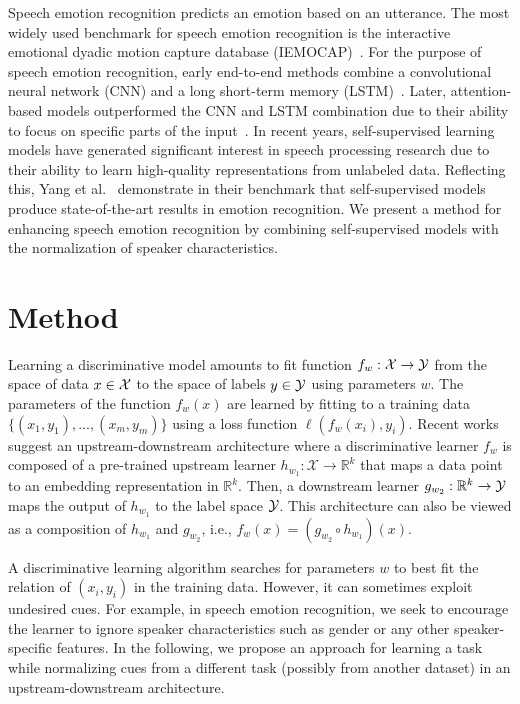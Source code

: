 \documentclass{article}
\newcommand{\X}{\cal X}
\newcommand{\Y}{\cal Y}
\renewcommand{\[}{\begin{eqnarray}}
\renewcommand{\]}{\end{eqnarray}}
\newcommand{\R}{\mathbb{R}}
\begin{document}
Speech emotion recognition predicts an emotion based on an utterance. The most widely used benchmark for speech emotion recognition is the interactive emotional dyadic motion capture database (IEMOCAP)~\cite{iemocap}. For the purpose of speech emotion recognition, early end-to-end methods combine a convolutional neural network (CNN) and a long short-term memory (LSTM)~\cite{Keren2016ConvolutionalRA, Mirsamadi2017AutomaticSE, Trigeorgis2016AdieuFE}. Later, attention-based models outperformed the CNN and LSTM combination due to their ability to focus on specific parts of the input~\cite{moine2021speaker, Chen20183DCR, Li2019ImprovedES}. In recent years, self-supervised learning models have generated significant interest in speech processing research due to their ability to learn high-quality representations from unlabeled data. Reflecting this, Yang et al.~\cite{s3prl} demonstrate in their benchmark that self-supervised models produce state-of-the-art results in emotion recognition. We present a method for enhancing speech emotion recognition by combining self-supervised models with the normalization of speaker characteristics.




\section{Method}\label{sec:method}
Learning a discriminative model amounts to fit function $f_w: \X \rightarrow \Y$ from the space of data $x \in \X$ to the space of labels $y \in \Y$ using parameters $w$. The parameters of the function $f_w(x)$ are learned by fitting to a training data $\{(x_1,y_1),..., (x_m,y_m)\}$ using a loss function $\ell(f_w(x_i),y_i)$. Recent works suggest an upstream-downstream architecture where a discriminative learner $f_w$  is composed of a pre-trained upstream learner $h_{w_1}:\mathcal{X} \rightarrow \R^k$ that maps a data point to an embedding representation in $\R^{k}$. Then, a downstream learner $g_{w_2}: \R^{k}\rightarrow\Y$ maps the output of $h_{w_1}$ to the label space $\Y$. This architecture can also be viewed as a composition of $h_{w_1}$ and $g_{w_2}$, i.e., $f_w(x) = (g_{w_2} \circ h_{w_1})(x)$.

A discriminative learning algorithm searches for parameters $w$ to best fit the relation of $(x_i,y_i)$ in the training data. However, it can sometimes exploit undesired cues. For example, in speech emotion recognition, we seek to encourage the learner to ignore speaker characteristics such as gender or any other speaker-specific features. In the following, we propose an approach for learning a task while normalizing cues from a different task (possibly from another dataset) in an upstream-downstream architecture.
\end{document}
